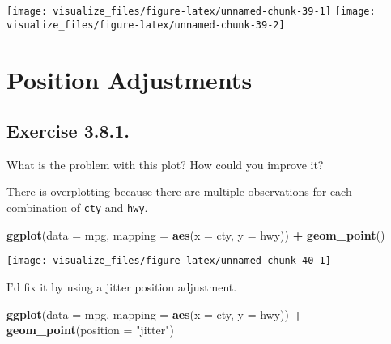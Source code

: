 \documentclass[]{book}
\newenvironment{Shaded}{\begin{snugshade}}{\end{snugshade}}
\newcommand{\DataTypeTok}[1]{\textcolor[rgb]{0.13,0.29,0.53}{#1}}
\newcommand{\KeywordTok}[1]{\textcolor[rgb]{0.13,0.29,0.53}{\textbf{#1}}}
\newcommand{\NormalTok}[1]{#1}
\newcommand{\OperatorTok}[1]{\textcolor[rgb]{0.81,0.36,0.00}{\textbf{#1}}}
\newcommand{\StringTok}[1]{\textcolor[rgb]{0.31,0.60,0.02}{#1}}
\theoremstyle{plain}
\theoremstyle{remark}
\begin{document}
\begin{center}\texttt{[image: visualize\_files/figure-latex/unnamed-chunk-39-1]} \texttt{[image: visualize\_files/figure-latex/unnamed-chunk-39-2]} \end{center}

\hypertarget{position-adjustments}{%
\section{Position Adjustments}\label{position-adjustments}}

\hypertarget{exercise-3.8.1.}{%
\subsection*{\texorpdfstring{Exercise
{3.8.1}.}{Exercise 3.8.1.}}\label{exercise-3.8.1.}}

What is the problem with this plot? How could you improve it?

There is overplotting because there are multiple observations for each
combination of \texttt{cty} and \texttt{hwy}.

\begin{Shaded}
\begin{Highlighting}[]
\KeywordTok{ggplot}\NormalTok{(}\DataTypeTok{data =}\NormalTok{ mpg, }\DataTypeTok{mapping =} \KeywordTok{aes}\NormalTok{(}\DataTypeTok{x =}\NormalTok{ cty, }\DataTypeTok{y =}\NormalTok{ hwy)) }\OperatorTok{+}
\StringTok{  }\KeywordTok{geom_point}\NormalTok{()}
\end{Highlighting}
\end{Shaded}

\begin{center}\texttt{[image: visualize\_files/figure-latex/unnamed-chunk-40-1]} \end{center}

I'd fix it by using a jitter position adjustment.

\begin{Shaded}
\begin{Highlighting}[]
\KeywordTok{ggplot}\NormalTok{(}\DataTypeTok{data =}\NormalTok{ mpg, }\DataTypeTok{mapping =} \KeywordTok{aes}\NormalTok{(}\DataTypeTok{x =}\NormalTok{ cty, }\DataTypeTok{y =}\NormalTok{ hwy)) }\OperatorTok{+}
\StringTok{  }\KeywordTok{geom_point}\NormalTok{(}\DataTypeTok{position =} \StringTok{"jitter"}\NormalTok{)}
\end{Highlighting}
\end{Shaded}
\end{document}
